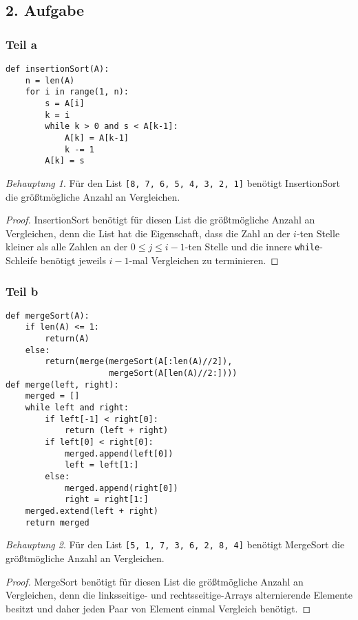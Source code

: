 \documentclass[draft,a5paper]{article}
\theoremstyle{remark}
\newtheorem*{Behauptung}{Behauptung}
\begin{document}
\subsection{2. Aufgabe}
\subsubsection{Teil a}
\begin{verbatim}
def insertionSort(A):
    n = len(A)
    for i in range(1, n):
        s = A[i]
        k = i
        while k > 0 and s < A[k-1]:
            A[k] = A[k-1]
            k -= 1
        A[k] = s
\end{verbatim}
\begin{Behauptung}
  Für den List \texttt{[8, 7, 6, 5, 4, 3, 2, 1]}
benötigt InsertionSort die größtmögliche Anzahl an
Vergleichen.
\end{Behauptung}
\begin{proof}
  InsertionSort benötigt für diesen List die größtmögliche
Anzahl an Vergleichen, denn die List hat die
Eigenschaft, dass die Zahl an der \(i\)-ten Stelle kleiner als
alle Zahlen an der \(0 \le j \le i-1\)-ten Stelle und
die innere \texttt{while}-Schleife benötigt jeweils
\(i-1\)-mal Vergleichen zu terminieren.
\end{proof}
\subsubsection{Teil b}
\begin{verbatim}
def mergeSort(A):
    if len(A) <= 1:
        return(A)
    else:
        return(merge(mergeSort(A[:len(A)//2]),
                     mergeSort(A[len(A)//2:])))
def merge(left, right):
    merged = []
    while left and right:
        if left[-1] < right[0]:
            return (left + right)
        if left[0] < right[0]:
            merged.append(left[0])
            left = left[1:]
        else:
            merged.append(right[0])
            right = right[1:]
    merged.extend(left + right)
    return merged
\end{verbatim}
\begin{Behauptung}
  Für den List \texttt{[5, 1, 7, 3, 6, 2, 8, 4]}
benötigt MergeSort die größtmögliche Anzahl an
Vergleichen.
\end{Behauptung}
\begin{proof}
  MergeSort benötigt für diesen List die größtmögliche Anzahl an
  Vergleichen, denn die linksseitige- und rechtsseitige-Arrays
  alternierende Elemente besitzt und daher jeden Paar von Element
  einmal Vergleich benötigt.
\end{proof}
\end{document}
